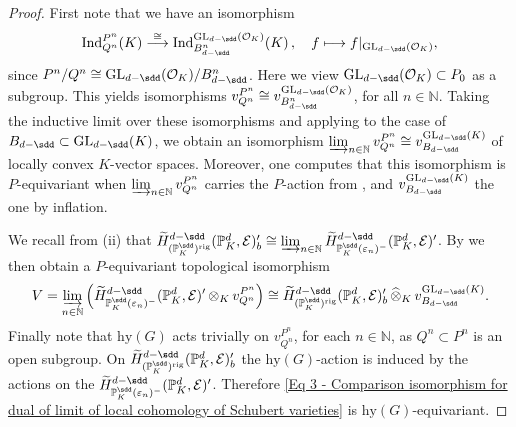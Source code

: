 \documentclass[a4paper, reqno, 10pt]{amsart}
\theoremstyle{definition}
\numberwithin{equation}{section}
\newcommand{\botimes}[1]{{\,\otimes_{#1}\,}}
\newcommand{\cotimes}[1]{{\,\widehat{\otimes}_{#1}\,}}
\newcommand{\GL}{{\mathrm{GL}}}
\newcommand{\hy}{{\mathrm{hy}}}
\newcommand{\Ind}{{\mathrm{Ind}}}
\newcommand{\lra}{\longrightarrow}
\newcommand{\lto}{\longmapsto}
\newcommand{\res}[1]{{\!\,\mid_{#1}}}
\newcommand{\rig}{{\mathrm{rig}}}
\newcommand{\BN}{{\mathbb {N}}}
\newcommand{\BP}{{\mathbb {P}}}
\newcommand{\CE}{{\mathcal {E}}}
\newcommand{\CO}{{\mathcal {O}}}
\begin{document}
\begin{proof}
	First note that we have an isomorphism
	\begin{equation*}
		\Ind^{P^n}_{Q^n} (K) \overset{\cong}{\lra} \Ind^{\GL_{d-\sdd}(\CO_K)}_{B_{d-\sdd}^n} (K) \,,\quad f \lto f\res{\GL_{d-\sdd}(\CO_K)} ,
	\end{equation*}
	since $P^n/Q^n \cong \GL_{d-\sdd}(\CO_K)/B_{d-\sdd}^n$.
	Here we view $\GL_{d-\sdd}(\CO_K) \subset P_0$ as a subgroup.
	This yields isomorphisms $v^{P^n}_{Q^n} \cong v^{\GL_{d-\sdd}(\CO_K)}_{B_{d-\sdd}^n}$, for all $n\in \BN$.
	Taking the inductive limit over these isomorphisms and applying  to the case of $B_{d-\sdd} \subset \GL_{d-\sdd}(K)$, we obtain an isomorphism $\varinjlim_{n \in \BN} v^{P^n}_{Q^n} \cong v^{\GL_{d-\sdd}(K)}_{B_{d-\sdd}}$ of locally convex $K$-vector spaces.
	Moreover, one computes that this isomorphism is $P$-equivariant when $\varinjlim_{n \in \BN} v^{P^n}_{Q^n}$ carries the $P$-action from , and $v^{\GL_{d-\sdd}(K)}_{B_{d-\sdd}}$ the one by inflation.
	
	
	We recall from  (ii) that $\widetilde{H}^{d-\sdd}_{(\BP_K^\sdd )^\rig} (\BP_K^d , \CE)'_b \cong \varinjlim_{n \in \BN} \widetilde{H}^{d-\sdd}_{\BP_K^\sdd(\varepsilon_n)^-} (\BP_K^d , \CE)'$.
	By \cite[Prop.\ 1.1.32]{Emerton17LocAnVect} we then obtain a $P$-equivariant topological isomorphism
	\begin{equation}\label{Eq 3 - Comparison isomorphism for dual of limit of local cohomology of Schubert varieties}
		V = \varinjlim_{n \in \BN} \Big( \widetilde{H}^{d-\sdd}_{\BP_K^\sdd(\varepsilon_n)^-} (\BP_K^d , \CE)' \botimes{K} v^{P^n}_{Q^n} \Big) 
		\cong \widetilde{H}^{d-\sdd}_{(\BP_K^\sdd )^\rig} (\BP_K^d , \CE)'_b \cotimes{K} v^{\GL_{d-\sdd}(K)}_{B_{d-\sdd}} .
	\end{equation}
	Finally note that $\hy(G)$ acts trivially on $v^{P^n}_{Q^n}$, for each $n\in \BN$, as $Q^n\subset P^n$ is an open subgroup.
	On $\widetilde{H}^{d-\sdd}_{(\BP_K^\sdd )^\rig} (\BP_K^d , \CE)'_b$ the $\hy(G)$-action is induced by the actions on the $\widetilde{H}^{d-\sdd}_{\BP_K^\sdd(\varepsilon_n)^-} (\BP_K^d , \CE)'$.
	Therefore \eqref{Eq 3 - Comparison isomorphism for dual of limit of local cohomology of Schubert varieties} is $\hy(G)$-equivariant.
\end{proof}
\end{document}

